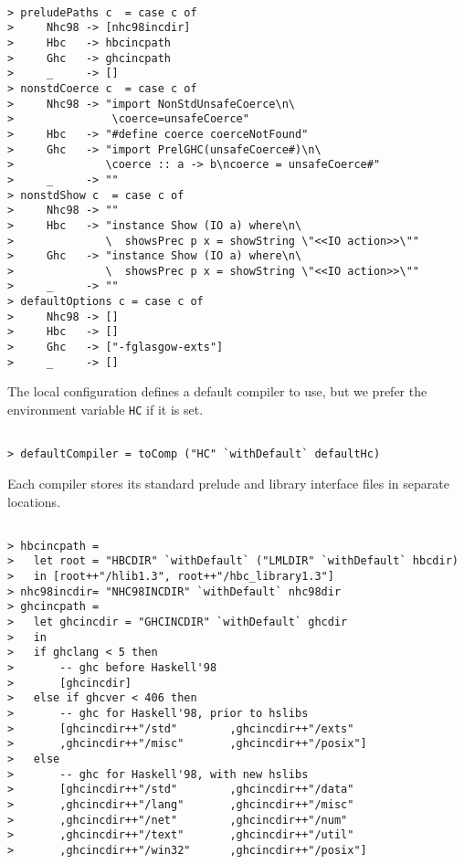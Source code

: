 \documentclass[a4paper]{article}
\begin{document}
\begin{verbatim}

> preludePaths c  = case c of
>     Nhc98 -> [nhc98incdir]
>     Hbc   -> hbcincpath
>     Ghc   -> ghcincpath
>     _     -> []
> nonstdCoerce c  = case c of
>     Nhc98 -> "import NonStdUnsafeCoerce\n\ 
>               \coerce=unsafeCoerce"
>     Hbc   -> "#define coerce coerceNotFound"
>     Ghc   -> "import PrelGHC(unsafeCoerce#)\n\ 
>              \coerce :: a -> b\ncoerce = unsafeCoerce#"
>     _     -> ""
> nonstdShow c  = case c of
>     Nhc98 -> ""
>     Hbc   -> "instance Show (IO a) where\n\ 
>              \  showsPrec p x = showString \"<<IO action>>\""
>     Ghc   -> "instance Show (IO a) where\n\ 
>              \  showsPrec p x = showString \"<<IO action>>\""
>     _     -> ""
> defaultOptions c = case c of
>     Nhc98 -> []
>     Hbc   -> []
>     Ghc   -> ["-fglasgow-exts"]
>     _     -> []

\end{verbatim}

The local configuration defines a default compiler to use, but we
prefer the environment variable {\tt HC} if it is set.

\begin{verbatim}

> defaultCompiler = toComp ("HC" `withDefault` defaultHc)

\end{verbatim}

Each compiler stores its standard prelude and library interface files
in separate locations.

\begin{verbatim}

> hbcincpath =
>   let root = "HBCDIR" `withDefault` ("LMLDIR" `withDefault` hbcdir)
>   in [root++"/hlib1.3", root++"/hbc_library1.3"]
> nhc98incdir= "NHC98INCDIR" `withDefault` nhc98dir
> ghcincpath =
>   let ghcincdir = "GHCINCDIR" `withDefault` ghcdir
>   in
>   if ghclang < 5 then
>       -- ghc before Haskell'98
>       [ghcincdir]
>   else if ghcver < 406 then
>       -- ghc for Haskell'98, prior to hslibs
>       [ghcincdir++"/std"        ,ghcincdir++"/exts"
>       ,ghcincdir++"/misc"       ,ghcincdir++"/posix"]
>   else
>       -- ghc for Haskell'98, with new hslibs
>       [ghcincdir++"/std"        ,ghcincdir++"/data"
>       ,ghcincdir++"/lang"       ,ghcincdir++"/misc"
>       ,ghcincdir++"/net"        ,ghcincdir++"/num"
>       ,ghcincdir++"/text"       ,ghcincdir++"/util"
>       ,ghcincdir++"/win32"      ,ghcincdir++"/posix"]

\end{verbatim}
\end{document}
